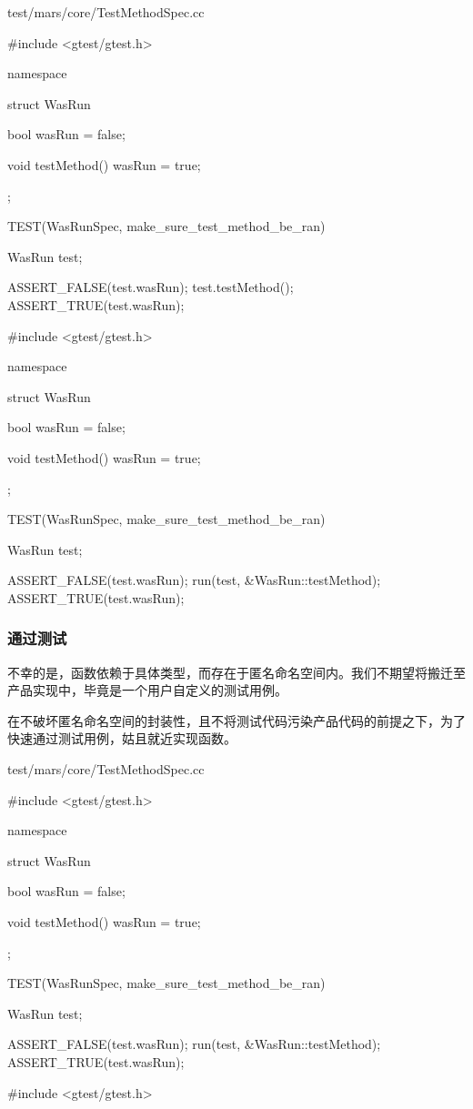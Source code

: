 \begin{content}
\begin{diff}{test/mars/core/TestMethodSpec.cc}
\begin{minicpp}
#include <gtest/gtest.h>

namespace {
  struct WasRun {
    bool wasRun = false;

    void testMethod() {
      wasRun = true;
    }
  };
}

TEST(WasRunSpec, make_sure_test_method_be_ran) {
  WasRun test;

  ASSERT_FALSE(test.wasRun);
  test.testMethod();
  ASSERT_TRUE(test.wasRun);
}
\end{minicpp}
\tcblower
\begin{minicpp}
#include <gtest/gtest.h>

namespace {
  struct WasRun {
    bool wasRun = false;

    void testMethod() {
      wasRun = true;
    }
  };
}

TEST(WasRunSpec, make_sure_test_method_be_ran) {
  WasRun test;

  ASSERT_FALSE(test.wasRun);
  run(test, &WasRun::testMethod);
  ASSERT_TRUE(test.wasRun);
}
\end{minicpp}
\end{diff}

\subsubsection{通过测试}

不幸的是，函数依赖于具体类型，而存在于匿名命名空间内。我们不期望将搬迁至产品实现中，毕竟是一个用户自定义的测试用例。

在不破坏匿名命名空间的封装性，且不将测试代码污染产品代码的前提之下，为了快速通过测试用例，姑且就近实现函数。

\begin{diff}{test/mars/core/TestMethodSpec.cc}
\begin{minicpp}
#include <gtest/gtest.h>

namespace {
  struct WasRun {
    bool wasRun = false;

    void testMethod() {
      wasRun = true;
    }
  };
}

TEST(WasRunSpec, make_sure_test_method_be_ran) {
  WasRun test;

  ASSERT_FALSE(test.wasRun);
  run(test, &WasRun::testMethod);
  ASSERT_TRUE(test.wasRun);
}
\end{minicpp}
\tcblower
\begin{minicpp}
#include <gtest/gtest.h>


\end{minicpp}
\end{diff}
\end{content}

